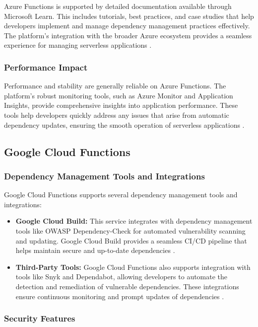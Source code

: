 \documentclass[sigconf]{acmart}
\begin{document}
Azure Functions is supported by detailed documentation available through Microsoft Learn. This includes tutorials, best practices, and case studies that help developers implement and manage dependency management practices effectively. The platform's integration with the broader Azure ecosystem provides a seamless experience for managing serverless applications \cite{azureLearn2023}.

\subsubsection{Performance Impact}

Performance and stability are generally reliable on Azure Functions. The platform's robust monitoring tools, such as Azure Monitor and Application Insights, provide comprehensive insights into application performance. These tools help developers quickly address any issues that arise from automatic dependency updates, ensuring the smooth operation of serverless applications \cite{azurePerformance2023}.

\subsection{Google Cloud Functions}

\subsubsection{Dependency Management Tools and Integrations}

Google Cloud Functions supports several dependency management tools and integrations:

\begin{itemize}
    \item \textbf{Google Cloud Build:} This service integrates with dependency management tools like OWASP Dependency-Check for automated vulnerability scanning and updating. Google Cloud Build provides a seamless CI/CD pipeline that helps maintain secure and up-to-date dependencies \cite{googleBuild2023}.
    \item \textbf{Third-Party Tools:} Google Cloud Functions also supports integration with tools like Snyk and Dependabot, allowing developers to automate the detection and remediation of vulnerable dependencies. These integrations ensure continuous monitoring and prompt updates of dependencies \cite{googlesnyk2023}.
\end{itemize}

\subsubsection{Security Features}
\end{document}
